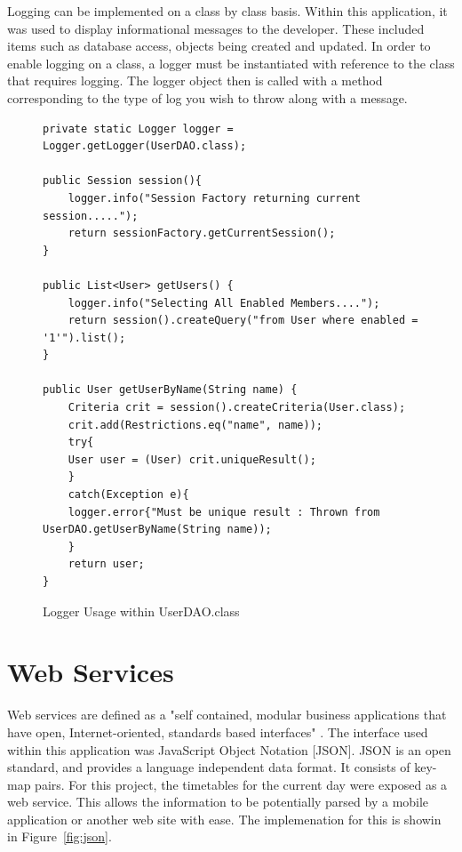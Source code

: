 Logging can be implemented on a class by class basis. Within this application, it was used to display informational messages to the developer. These included items such as database access, objects being created and updated. In order to enable logging on a class, a logger must be instantiated with reference to the class that requires logging. The logger object then is called with a method corresponding to the type of log you wish to throw along with a message.

\begin{figure}[H]
\begin{lstlisting}
private static Logger logger = Logger.getLogger(UserDAO.class);

public Session session(){ 
	logger.info("Session Factory returning current session.....");
	return sessionFactory.getCurrentSession();
}

public List<User> getUsers() {
	logger.info("Selecting All Enabled Members....");
	return session().createQuery("from User where enabled = '1'").list();
}

public User getUserByName(String name) {
	Criteria crit = session().createCriteria(User.class);
	crit.add(Restrictions.eq("name", name)); 
	try{
	User user = (User) crit.uniqueResult();
	}
	catch(Exception e){
	logger.error{"Must be unique result : Thrown from UserDAO.getUserByName(String name));
	}
	return user;
}
\end{lstlisting}
\caption{Logger Usage within UserDAO.class}
\end{figure}

\section{Web Services}

Web services are defined as a "self contained, modular business  applications that have open, Internet-oriented, standards based interfaces" \parencite{alonso2004web}. The interface used within this application was JavaScript Object Notation [JSON]. JSON is an open standard, and provides a language independent data format. It consists of key-map pairs. For this project, the timetables for the current day were exposed as a web service. This allows the information to be potentially parsed by a mobile application or another web site with ease. The implemenation for this is showin in Figure~\ref{fig:json}.

